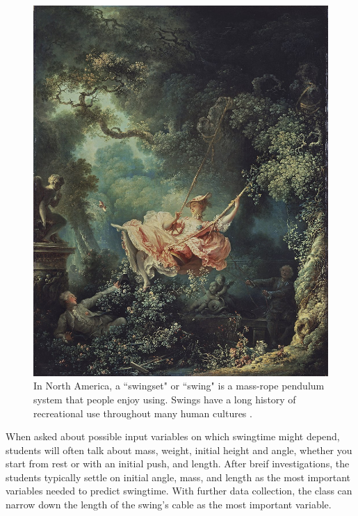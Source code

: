 \documentclass[12pt]{iopart}
\begin{document}
\begin{figure}[h]
\centering
        \includegraphics[width=\columnwidth]{Fragonard,_The_Swing.jpg}
\caption{
In North America, a ``swingset" or ``swing" is a mass-rope pendulum system that people enjoy using.
        Swings have a long history of recreational use throughout many human cultures \cite{swings-wikipedia}.
}
\label{buffet}
\end{figure}

When asked about possible input variables on which swingtime might depend, students will often talk about mass, weight, initial height and angle, whether you start from rest or with an initial push, and length.  
After breif investigations, the students typically settle on initial angle, mass, and length as the most important variables needed to predict swingtime.  
With further data collection, the class can narrow down the length of the swing's cable as the most important variable.  
\end{document}
